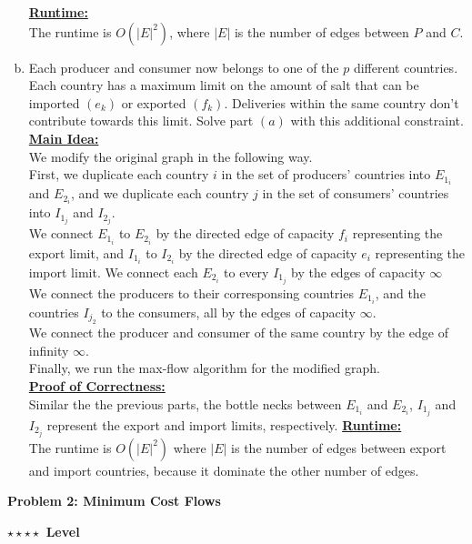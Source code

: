 \documentclass{article}\usepackage[utf8]{inputenc}\usepackage[margin=0.4cm,top=0.4cm,bottom=0.4cm]{geometry}\usepackage[usenames,dvipsnames,svgnames,table]{xcolor}
\begin{document}
\begin{enumerate}[(a)]
\underline{\textbf{Runtime:}}\\
The runtime is $O\left(|E|^2\right)$, where $|E|$ is the number of edges between $P$ and $C$.
\EndSolution
\item Each producer and consumer now belongs to one of the $p$ different countries. Each country has a maximum limit on the amount of salt that can be imported $(e_k)$ or exported $(f_k)$. Deliveries within the same country don't contribute towards this limit. Solve part $(a)$ with this additional constraint.
\BeginSolution %
\\
\underline{\textbf{Main Idea:}} \\
We modify the original graph in the following way.\\
First, we duplicate each country $i$ in the set of producers' countries into $E_{1_i}$ and $E_{2_i}$, and we duplicate each country $j$ in the set of consumers' countries into $I_{1_j}$ and $I_{2_j}$.\\
We connect $E_{1_i}$ to $E_{2_i}$ by the directed edge of capacity $f_i$ representing the export limit, and $I_{1_i}$ to $I_{2_i}$ by the directed edge of capacity $e_i$ representing the import limit. We connect each $E_{2_i}$ to every $I_{1_j}$ by the edges of capacity $\infty$\\
We connect the producers to their corresponsing countries $E_{1_i}$, and the countries $I_{j_2}$ to the consumers, all by the edges of capacity $\infty$.\\
We connect the producer and consumer of the same country by the edge of infinity $\infty$.\\
Finally, we run the max-flow algorithm for the modified graph.\\
\underline{\textbf{Proof of Correctness:}} \\
Similar the the previous parts, the bottle necks between $E_{1_i}$ and $E_{2_i}$, $I_{1_j}$ and $I_{2_j}$ represent the export and import limits, respectively.
\underline{\textbf{Runtime:}}\\
The runtime is $O\left(|E|^2\right)$ where $|E|$ is the number of edges between export and import countries, because it dominate the other number of edges.
\EndSolution
\end{enumerate}
\clearpage

\vspace{-2mm}\noindent\begin{mybox}{\begin{center}\textbf{\color{black}Problem 2: Minimum Cost Flows}\end{center}}\end{mybox}\vspace{-2mm}
\begin{myboxot}\noindent\textbf{$\star\star\star\star$ Level}\end{myboxot} 
\end{document}
